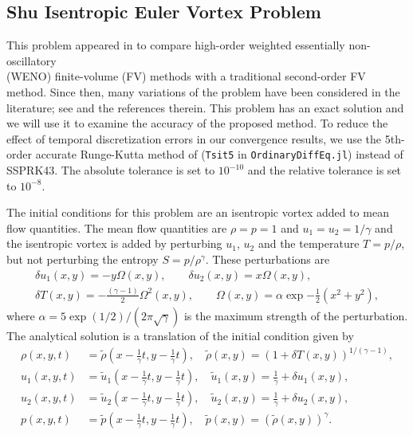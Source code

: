 \documentclass{elsarticle}
\theoremstyle{definition}
\theoremstyle{plain}
\theoremstyle{plain}
\newcommand{\reftwo}[1]{{\color{blue}#1}}
\renewcommand{\reftwo}[1]{#1}
\begin{document}
\subsection{Shu Isentropic Euler Vortex Problem}\label{Ex: Vortex Problem}
This problem appeared in \cite{Shu1998Vortex} to compare high-order weighted essentially non-oscillatory \\
(WENO) finite-volume (FV) methods with a traditional second-order FV method. Since then, many variations of the problem have been considered in the literature; see \cite{Spiegal2015VortexProblem} and the references therein. This problem has an exact solution and we will use it to examine the accuracy of the proposed method. To reduce the effect of temporal discretization errors in our convergence results, we use the 5th-order accurate Runge-Kutta method of \cite{TSITOURAS2011770} (\verb+Tsit5+ in \verb+OrdinaryDiffEq.jl+) instead of SSPRK43. The absolute tolerance is set to $10^{-10}$ and the relative tolerance is set to $10^{-8}$. 


The initial conditions for this problem are an isentropic vortex added to mean flow quantities. The mean flow quantities are $\rho = p = 1$ and $u_1 = u_2 = 1/\gamma$ and the isentropic vortex is added by perturbing $u_1$, $u_2$ and the temperature $T = p / \rho$, but not perturbing the entropy $S = p/\rho^{\gamma}$. These perturbations are
\begin{equation*}
\begin{gathered}
    \delta u_1(x,y) = -y{\Omega(x,y)}, \qquad \delta u_2(x,y) = x{\Omega(x,y)}, \\
    \delta T(x,y) = -\frac{(\gamma - 1)}{2}\Omega^{\reftwo{2}}(x,y), \qquad
    \Omega(x,y) = \alpha \exp{-\frac{1}{2}\left(x^2 + y^2\right)},
\end{gathered}
\end{equation*}
where $\alpha = 5 \exp{(1/2)} / (2 \pi \sqrt{\gamma})$ is the maximum strength of the perturbation. The analytical solution is a translation of the initial condition given by
\begin{equation}
\begin{aligned}\label{eq: isentropic solution}
    \rho(x,y,t) &= \tilde{\rho}\left(x - \frac{1}{\gamma}t, y - \frac{1}{\gamma} t\right), \quad \tilde{\rho}(x,y) = \left(1 + \delta T(x, y)\right)^{1/ (\gamma - 1)},\\
    u_1(x,y,t) &= \tilde{u}_1\left(x - \frac{1}{\gamma}t, y - \frac{1}{\gamma} t\right), \quad \tilde{u}_1(x,y) = \frac{1}{\gamma} + \delta u_1(x,y),\\
    u_2(x,y,t) &= \tilde{u}_2\left(x - \frac{1}{\gamma}t, y - \frac{1}{\gamma} t\right), \quad \tilde{u}_2(x,y) = \frac{1}{\gamma} + \delta u_{\reftwo{2}}(x,y),\\
    p(x,y,t) &= \tilde{p}\left(x - \frac{1}{\gamma}t,y-\frac{1}{\gamma}t\right), \quad \tilde{p}(x,y) = \left(\tilde{\rho}(x,y)\right)^\gamma.
\end{aligned}
\end{equation}
\end{document}
